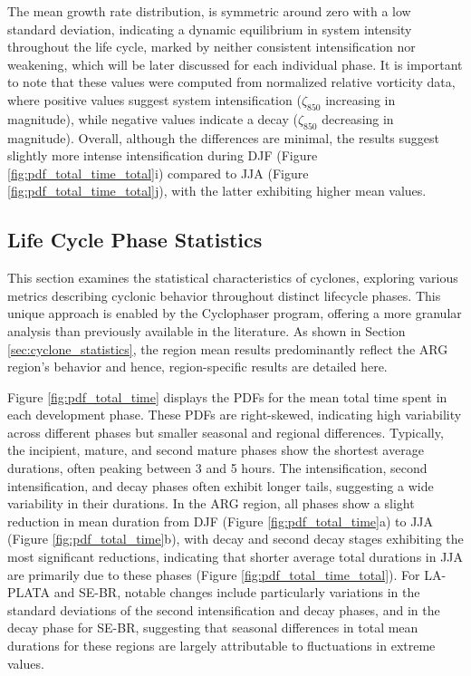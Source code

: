 The mean growth rate distribution, is symmetric around zero with a low standard deviation, indicating a dynamic equilibrium in system intensity throughout the life cycle, marked by neither consistent intensification nor weakening, which will be later discussed for each individual phase. It is important to note that these values were computed from normalized relative vorticity data, where positive values suggest system intensification (\(\zeta_{850}\) increasing in magnitude), while negative values indicate a decay (\(\zeta_{850}\) decreasing in magnitude). Overall, although the differences are minimal, the results suggest slightly more intense intensification during DJF (Figure \ref{fig:pdf_total_time_total}i) compared to JJA (Figure \ref{fig:pdf_total_time_total}j), with the latter exhibiting higher mean values.

\subsection{Life Cycle Phase Statistics}
\label{sec:life_cycle_phase_statistics}

This section examines the statistical characteristics of cyclones, exploring various metrics describing cyclonic behavior throughout distinct lifecycle phases. This unique approach is enabled by the Cyclophaser program, offering a more granular analysis than previously available in the literature. As shown in Section \ref{sec:cyclone_statistics}, the region mean results predominantly reflect the ARG region's behavior and hence, region-specific results are detailed here.

Figure \ref{fig:pdf_total_time} displays the PDFs for the mean total time spent in each development phase. These PDFs are right-skewed, indicating high variability across different phases but smaller seasonal and regional differences. Typically, the incipient, mature, and second mature phases show the shortest average durations, often peaking between 3 and 5 hours. The intensification, second intensification, and decay phases often exhibit longer tails, suggesting a wide variability in their durations. In the ARG region, all phases show a slight reduction in mean duration from DJF (Figure \ref{fig:pdf_total_time}a) to JJA (Figure \ref{fig:pdf_total_time}b), with decay and second decay stages exhibiting the most significant reductions, indicating that shorter average total durations in JJA are primarily due to these phases (Figure \ref{fig:pdf_total_time_total}). For LA-PLATA and SE-BR, notable changes include particularly variations in the standard deviations of the second intensification and decay phases, and in the decay phase for SE-BR, suggesting that seasonal differences in total mean durations for these regions are largely attributable to fluctuations in extreme values.


